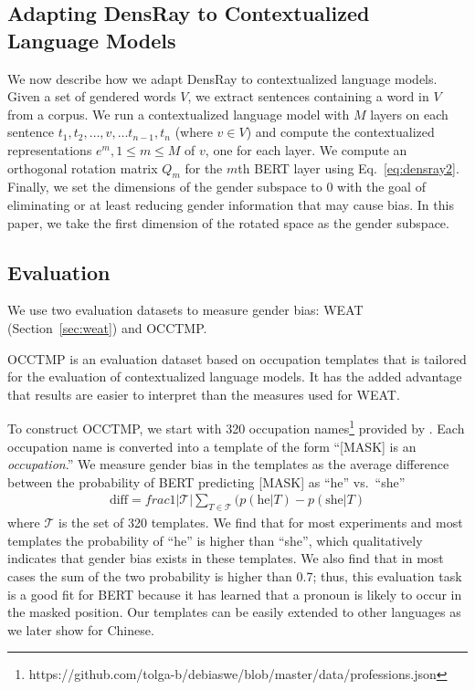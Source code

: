 \subsection{Adapting DensRay to Contextualized Language Models}
We now describe how we adapt DensRay to contextualized
language models. Given a set of gendered words
$V$, we extract sentences containing a word in $V$ from a
corpus. We run a contextualized language model
with $M$ layers
on each
sentence
$t_1,t_2,\ldots,v,\ldots t_{n-1},t_n$ (where $v \in V$)
and compute the contextualized representations $e^m, 1\leq m
\leq M$ of $v$, one for each layer. 
We compute an orthogonal rotation
matrix $Q_m$ for the $m$th BERT layer using Eq.\
\ref{eq:densray2}.
Finally, we set the dimensions
of the gender subspace to $0$ with the goal of eliminating
or at least reducing
gender
information that may cause bias. In this
paper, we take the first dimension of the rotated space as
the gender subspace.

\subsection{Evaluation}\label{sec:eval}
We use two evaluation datasets
to measure gender
bias: WEAT (Section~\ref{sec:weat}) and OCCTMP.

OCCTMP is an evaluation dataset
based on occupation templates
that
is tailored for 
the evaluation of contextualized language models.  It has
the added advantage that results are easier to interpret
than the measures used for WEAT.

To construct OCCTMP,
we start with 
320 occupation
names\footnote{https://github.com/tolga-b/debiaswe/blob/master/data/professions.json}
provided by \citet{bolukbasi2016man}.
Each occupation name is converted into a template of the form
``[MASK] is an \textit{occupation}.''
We measure
gender bias
in the templates as the average difference
between the probability of BERT predicting [MASK] as ``he''
vs.\ ``she''
\begin{eqnarray}
    \text{diff}=frac{1}{|{\mathcal T}|} \sum_{T \in
      {\mathcal T}}(p(\mbox{he}| T) - p(\mbox{she}|T)\nonumber
\end{eqnarray}
where $\mathcal T$ is the set of 320 templates.  We find
that for most experiments and most templates the probability
of ``he'' is higher than ``she'', which qualitatively
indicates that gender bias exists in these templates. We
also find that in most cases the sum of the two probability
is higher than 0.7; thus, this evaluation task is a good fit
for BERT because it has learned that a pronoun is likely to
occur in the masked position.
Our templates  can be easily extended to other
languages
as we later show for
Chinese.
